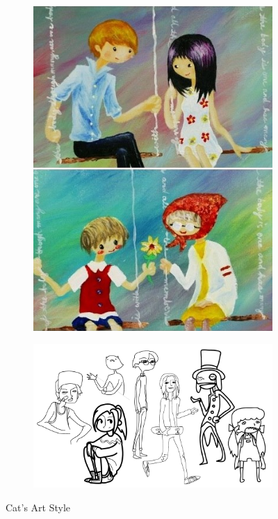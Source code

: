 \begin{figure}[H]
\begin{subfigure}{.3\textwidth}
    \includegraphics[width=.9\linewidth]{images/ref_CAT02}
  \end{subfigure}
  \begin{subfigure}{.6\textwidth}
    \centering
    \includegraphics[width=.9\linewidth]{images/ref_CAT01}
  \end{subfigure}
  \caption{Cat's Art Style}
  \label{fig:cstyle}
\end{figure}